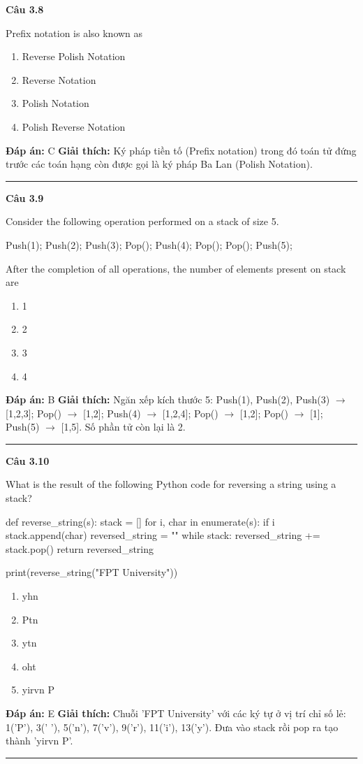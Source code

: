 \documentclass[11pt,a4paper]{article}
\newenvironment{question}[1]{%
  \par\vspace{1em}\noindent\textbf{\large Câu #1}\par\vspace{0.4em}
}{%
  \par\vspace{1em}\hrule\vspace{0.6em}
}
\newenvironment{choices}{%
  \begin{enumerate}[label=\textbf{\Alph*.},leftmargin=2.2em,itemsep=2pt,topsep=3pt]
}{%
  \end{enumerate}
}
\newcommand{\choice}{\item}
\newenvironment{codebox}{%
  \begin{tcolorbox}[colback=gray!8!white,colframe=gray!50!black,arc=1.5mm,boxrule=0.6pt,left=3mm,right=3mm,top=2.5mm,bottom=2.5mm]
  \ttfamily\small
}{%
  \end{tcolorbox}
}
\begin{document}
\begin{question}{3.8}
Prefix notation is also known as
\begin{choices}
\choice Reverse Polish Notation
\choice Reverse Notation
\choice Polish Notation
\choice Polish Reverse Notation
\end{choices}
\textbf{Đáp án:} C
\textbf{Giải thích:} Ký pháp tiền tố (Prefix notation) trong đó toán tử đứng trước các toán hạng còn được gọi là ký pháp Ba Lan (Polish Notation).
\end{question}

\begin{question}{3.9}
Consider the following operation performed on a stack of size 5.
\begin{codebox}
Push(1);
Push(2);
Push(3);
Pop();
Push(4);
Pop();
Pop();
Push(5);
\end{codebox}
After the completion of all operations, the number of elements present on stack are
\begin{choices}
\choice 1
\choice 2
\choice 3
\choice 4
\end{choices}
\textbf{Đáp án:} B
\textbf{Giải thích:} Ngăn xếp kích thước 5: Push(1), Push(2), Push(3) \(\to\) [1,2,3]; Pop() \(\to\) [1,2]; Push(4) \(\to\) [1,2,4]; Pop() \(\to\) [1,2]; Pop() \(\to\) [1]; Push(5) \(\to\) [1,5]. Số phần tử còn lại là 2.
\end{question}

\begin{question}{3.10}
What is the result of the following Python code for reversing a string using a stack?
\begin{codebox}
def reverse_string(s):
    stack = []
    for i, char in enumerate(s):
        if i %
            stack.append(char)
    reversed_string = ""
    while stack:
        reversed_string += stack.pop()
    return reversed_string

print(reverse_string("FPT University"))
\end{codebox}
\begin{choices}
\choice yhn
\choice Ptn
\choice ytn
\choice oht
\choice yirvn P
\end{choices}
\textbf{Đáp án:} E
\textbf{Giải thích:} Chuỗi 'FPT University' với các ký tự ở vị trí chỉ số lẻ: 1('P'), 3(' '), 5('n'), 7('v'), 9('r'), 11('i'), 13('y'). Đưa vào stack rồi pop ra tạo thành 'yirvn P'.
\end{question}
\end{document}
